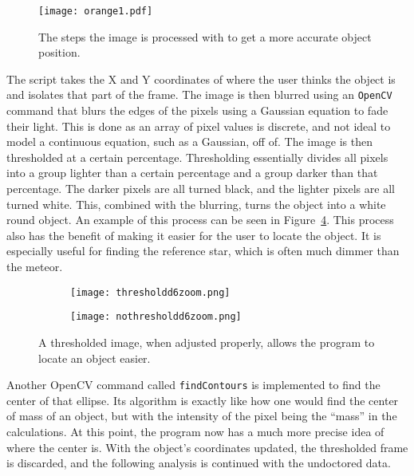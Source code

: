 \begin{figure}[h!]
	\centering
	\texttt{[image: orange1.pdf]}
	\caption{The steps the image is processed with to get a more accurate object position.}
	\label{fig:contourfinder}
\end{figure}

The script takes the X and Y coordinates of where the user thinks the object is and isolates that part of the frame. The image is then blurred using an \texttt{OpenCV} command that blurs the edges of the pixels using a Gaussian equation to fade their light. This is done as an array of pixel values is discrete, and not ideal to model a continuous equation, such as a Gaussian, off of. The image is then thresholded at a certain percentage. Thresholding essentially divides all pixels into a group lighter than a certain percentage and a group darker than that percentage. The darker pixels are all turned black, and the lighter pixels are all turned white. This, combined with the blurring, turns the object into a white round object. An example of this process can be seen in Figure~\ref{fig:ThresholdComparison}. This process also has the benefit of making it easier for the user to locate the object. It is especially useful for finding the reference star, which is often much dimmer than the meteor. 
\begin{figure}
\centering
\begin{subfigure}{.5\textwidth}
  \centering
  \texttt{[image: thresholdd6zoom.png]}
  \label{fig:nothresholdd6}
\end{subfigure}%
\begin{subfigure}{.5\textwidth}
  \centering
  \texttt{[image: nothresholdd6zoom.png]}
  \label{fig:thresholdd6}
\end{subfigure}
\caption{A thresholded image, when adjusted properly, allows the program to locate an object easier.}
\label{fig:ThresholdComparison}
\end{figure}

Another OpenCV command called \texttt{findContours} is implemented to find the center of that ellipse. Its algorithm is exactly like how one would find the center of mass of an object, but with the intensity of the pixel being the ``mass'' in the calculations. At this point, the program now has a much more precise idea of where the center is. With the object's coordinates updated, the thresholded frame is discarded, and the following analysis is continued with the undoctored data. 

